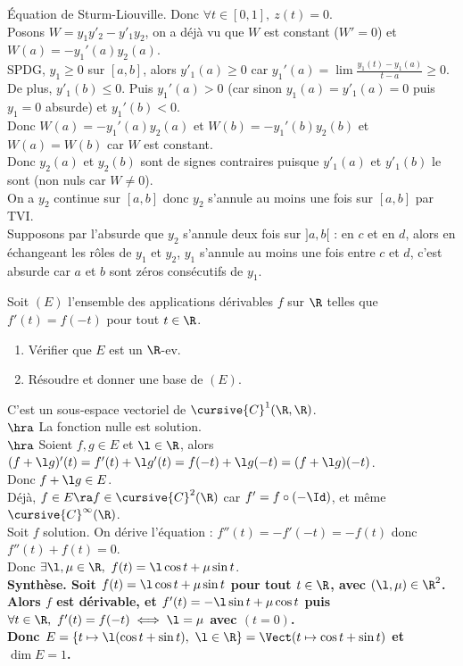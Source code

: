 \documentclass[11pt]{article}
\begin{document}
\begin{exercice}{Équation de Sturm-Liouville.}{}
    Donc $\forall t \in [0,1], ~ z(t)=0$.\\
     Posons $W=y_1y'_2-y'_1y_2$, on a déjà vu que $W$ est constant ($W'=0$) et $W(a)=-y_1'(a)y_2(a)$.\\
    SPDG, $y_1\geq0$ sur $[a,b]$, alors $y'_1(a)\geq0$ car $y_1'(a)=\lim \frac{y_1(t)-y_1(a)}{t-a}\geq0$.\\
    De plus, $y'_1(b)\leq0$. Puis $y_1'(a)>0$ (car sinon $y_1(a)=y'_1(a)=0$ puis $y_1=0$ absurde) et $y_1'(b)<0$.\\
    Donc $W(a)=-y_1'(a)y_2(a)$ et $W(b)=-y_1'(b)y_2(b)$ et $W(a)=W(b)$ car $W$ est constant.\\
    Donc $y_2(a)$ et $y_2(b)$ sont de signes contraires puisque $y'_1(a)$ et $y'_1(b)$ le sont (non nuls car $W\neq0$).\\
    On a $y_2$ continue sur $[a,b]$ donc $y_2$ s'annule au moins une fois sur $[a,b]$ par TVI.\\
    Supposons par l'absurde que $y_2$ s'annule deux fois sur $]a,b[$ : en $c$ et en $d$, alors en échangeant les rôles de $y_1$ et $y_2$, $y_1$ s'annule au moins une fois entre $c$ et $d$, c'est absurde car $a$ et $b$ sont zéros consécutifs de $y_1$.
\end{exercice}

\begin{exercice}{}{}
    Soit $(E)$ l'ensemble des applications dérivables $f$ sur $\R$ telles que $f'(t) = f(-t)$ pour tout $t\in\R$.
    \begin{enumerate}
        \item Vérifier que $E$ est un $\R$-ev.
        \item Résoudre et donner une base de $(E)$.
    \end{enumerate}
    \tcblower
     C'est un sous-espace vectoriel de $\cursive{C}^1(\R,\R)$.\\
    $\hra$ La fonction nulle est solution.\\
    $\hra$ Soient $f,g\in E$ et $\l\in\R$, alors $(f+\l g)'(t) = f'(t) + \l g'(t) = f(-t) + \l g(-t) = (f + \l g)(-t)$.\\
    Donc $f+\l g \in E$.\\
     Déjà, $f\in E \ra f\in\cursive{C}^2(\R)$ car $f'=f\circ (-\Id)$, et même $\cursive{C}^\infty(\R)$.\\
    Soit $f$ solution. On dérive l'équation : $f''(t) = -f'(-t) = -f(t)$ donc $f''(t) + f(t) = 0$.\\
    Donc $\exists \l,\mu\in\R, ~ f(t)=\l\cos t + \mu\sin t$.\\
    \bf{Synthèse.} Soit $f(t) = \l \cos t + \mu \sin t$ pour tout $t\in\R$, avec $(\l,\mu)\in\R^2$.\\
    Alors $f$ est dérivable, et $f'(t)=-\l \sin t + \mu \cos t$ puis $\forall t \in \R, ~ f'(t)=f(-t) \iff \l = \mu$ avec $(t=0)$.\\
    Donc $E=\{t\mapsto \l(\cos t + \sin t), ~ \l \in \R\}=\Vect(t\mapsto \cos t + \sin t)$ et $\dim E = 1$.
\end{exercice}
\end{document}
